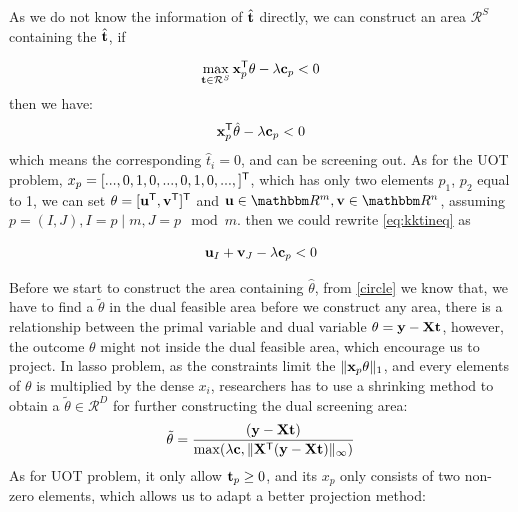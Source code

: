 As we do not know the information of $\hat{\mathbf t}$ directly, we can construct an area $\mathcal{R}^{S}$ containing the $\hat{\mathbf t}$, if

\begin{equation}
\max_{\mathbf t \in \mathcal{R}^S} \mathbf{x}_p^{\mathsf T}\theta -\lambda \mathbf c_p  < 0
\end{equation}
then we have:
 \begin{equation}
 \mathbf{x}_p^{\mathsf T}\hat{\theta} -\lambda \mathbf c_p  < 0 
 \label{eq:kktineq}
\end{equation}
which means the corresponding $\hat{t}_i = 0$, and can be screening out.
As for the UOT problem, $x_p = [...,0,1,0,...,0,1,0,...,]^{\mathsf T}$, which has only two elements $p_1$, $p_2$ equal to 1, we can set $\theta = [\mathbf u^{\mathsf T},\mathbf v^{\mathsf T}]^{\mathsf T}$ and $\vu\in\R^{m}, \vv\in\R^{n}$, assuming $p=(I,J), I = p \mid m, J = p \mod m$. then we could rewrite \ref{eq:kktineq} as 

 \begin{equation}
\mathbf u_{I} + \mathbf v_{J}-\lambda \mathbf c_p  < 0
\end{equation}

Before we start to construct the area containing $\hat{\theta}$, from \ref{circle} we know that, we have to find a $\tilde{\theta}$ in the dual feasible area before we construct any area, there is a relationship between the primal variable and dual variable $\theta = \mathbf y - \mathbf{X}\mathbf t$, however, the outcome $\theta$ might not inside the dual feasible area, which encourage us to project. In lasso problem, as the constraints limit the $\|\mathbf{x}_p \theta\|_1$, and every elements of $\theta$ is multiplied by the dense $x_i$, researchers has to use a shrinking method to obtain a $\tilde{\theta} \in \mathcal{R}^{D}$ for further constructing the dual screening area: 
\begin{equation}
\tilde{\theta} = \frac{(\mathbf y - \mathbf{X} \mathbf t)}{\max(\lambda \mathbf c, \|\mathbf{X}^{\mathsf T}(\mathbf y-\mathbf{X}\mathbf t)\|_{\infty})}
\end{equation}
As for UOT problem, it only allow $\mathbf t_p \geq 0$, and its $x_p$ only consists of two non-zero elements, which allows us to adapt a better projection method:

